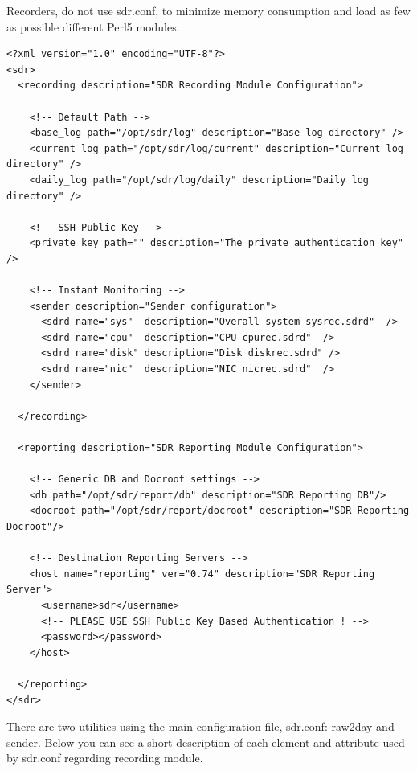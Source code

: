 Recorders, do not use sdr.conf, to minimize memory consumption and load
as few as possible different Perl5 modules.

\begin{center}
\begin{minipage}{0.9\textwidth}
\lstset{language=XML}
\begin{lstlisting}
<?xml version="1.0" encoding="UTF-8"?>
<sdr>
  <recording description="SDR Recording Module Configuration">

    <!-- Default Path -->
    <base_log path="/opt/sdr/log" description="Base log directory" />
    <current_log path="/opt/sdr/log/current" description="Current log directory" />
    <daily_log path="/opt/sdr/log/daily" description="Daily log directory" />

    <!-- SSH Public Key -->
    <private_key path="" description="The private authentication key" />

    <!-- Instant Monitoring -->
    <sender description="Sender configuration">
      <sdrd name="sys"  description="Overall system sysrec.sdrd"  />
      <sdrd name="cpu"  description="CPU cpurec.sdrd"  />
      <sdrd name="disk" description="Disk diskrec.sdrd" />
      <sdrd name="nic"  description="NIC nicrec.sdrd"  />
    </sender>

  </recording>

  <reporting description="SDR Reporting Module Configuration">

    <!-- Generic DB and Docroot settings -->
    <db path="/opt/sdr/report/db" description="SDR Reporting DB"/>
    <docroot path="/opt/sdr/report/docroot" description="SDR Reporting Docroot"/>

    <!-- Destination Reporting Servers -->
    <host name="reporting" ver="0.74" description="SDR Reporting Server">
      <username>sdr</username>
      <!-- PLEASE USE SSH Public Key Based Authentication ! -->
      <password></password>
    </host>

  </reporting>
</sdr>
\end{lstlisting}
\end{minipage}
\end{center}

There are two utilities using the main configuration file,
sdr.conf: raw2day and sender.  Below you can see a short description
of each element and attribute used by sdr.conf regarding recording module.

